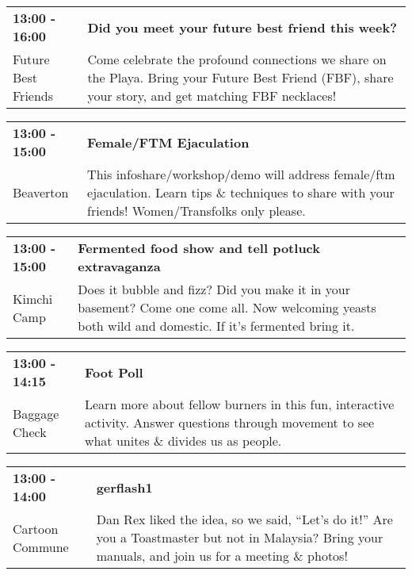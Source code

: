 \begin{tabular}{ p{1in} p{2.2in} }
    \textbf{13:00 - 16:00} & \textbf{Did you meet your future best friend this week?} \\
    Future Best Friends \newline  & Come celebrate the profound connections we share on the Playa. Bring your Future Best Friend (FBF), share your story, and get matching FBF necklaces! \\
    \hline 
\end{tabular}
    
\begin{tabular}{ p{1in} p{2.2in} }
    \textbf{13:00 - 15:00} & \textbf{Female/FTM Ejaculation} \\
    Beaverton \newline  & This infoshare/workshop/demo will address female/ftm ejaculation. Learn tips \& techniques to share with your friends! Women/Transfolks only please. \\
    \hline 
\end{tabular}
    
\begin{tabular}{ p{1in} p{2.2in} }
    \textbf{13:00 - 15:00} & \textbf{Fermented food show and tell potluck extravaganza} \\
    Kimchi Camp \newline  & Does it bubble and fizz? Did you make it in your basement? Come one come all. Now welcoming yeasts both wild and domestic. If it's fermented bring it. \\
    \hline 
\end{tabular}
    
\begin{tabular}{ p{1in} p{2.2in} }
    \textbf{13:00 - 14:15} & \textbf{Foot Poll} \\
    Baggage Check \newline  & Learn more about fellow burners in this fun, interactive activity. Answer questions through movement to see what unites \& divides us as people. \\
    \hline 
\end{tabular}
    
\begin{tabular}{ p{1in} p{2.2in} }
    \textbf{13:00 - 14:00} & \textbf{gerflash1} \\
    Cartoon Commune \newline  & Dan Rex liked the idea, so we said, ``Let's do it!'' Are you a Toastmaster but not in Malaysia? Bring your manuals, and join us for a meeting \& photos! \\
    \hline 
\end{tabular}
    
